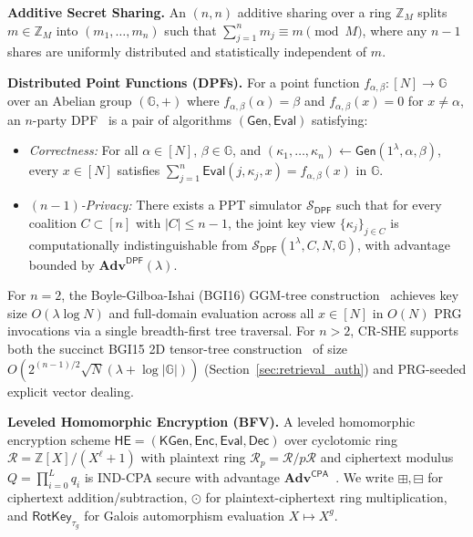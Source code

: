 \documentclass[11pt,a4paper]{article}
\begin{document}
\textbf{Additive Secret Sharing.} An $(n,n)$ additive sharing over a ring $\mathbb{Z}_M$ splits $m \in \mathbb{Z}_M$ into $(m_1, \dots, m_n)$ such that $\sum_{j=1}^n m_j \equiv m \pmod M$, where any $n-1$ shares are uniformly distributed and statistically independent of $m$.

\textbf{Distributed Point Functions (DPFs).} For a point function $f_{\alpha,\beta} : [N] \to \mathbb{G}$ over an Abelian group $(\mathbb{G}, +)$ where $f_{\alpha,\beta}(\alpha) = \beta$ and $f_{\alpha,\beta}(x) = 0$ for $x \neq \alpha$, an $n$-party DPF~\cite{gilboa2014,boyle2015,boyle2016} is a pair of algorithms $(\mathsf{Gen}, \mathsf{Eval})$ satisfying:
\begin{itemize}\setlength{\itemsep}{2pt}\setlength{\parskip}{0pt}
    \item \textit{Correctness:} For all $\alpha \in [N]$, $\beta \in \mathbb{G}$, and $(\kappa_1, \dots, \kappa_n) \leftarrow \mathsf{Gen}(1^\lambda, \alpha, \beta)$, every $x \in [N]$ satisfies $\sum_{j=1}^n \mathsf{Eval}(j, \kappa_j, x) = f_{\alpha,\beta}(x)$ in $\mathbb{G}$.
    \item \textit{$(n-1)$-Privacy:} There exists a PPT simulator $\mathcal{S}_{\mathsf{DPF}}$ such that for every coalition $C \subset [n]$ with $|C| \le n-1$, the joint key view $\{\kappa_j\}_{j \in C}$ is computationally indistinguishable from $\mathcal{S}_{\mathsf{DPF}}(1^\lambda, C, N, \mathbb{G})$, with advantage bounded by $\mathbf{Adv}^{\mathsf{DPF}}(\lambda)$.
\end{itemize}
For $n = 2$, the Boyle-Gilboa-Ishai (BGI16) GGM-tree construction~\cite{boyle2016} achieves key size $O(\lambda \log N)$ and full-domain evaluation across all $x \in [N]$ in $O(N)$ PRG invocations via a single breadth-first tree traversal. For $n > 2$, CR-SHE supports both the succinct BGI15 2D tensor-tree construction~\cite{boyle2015} of size $O(2^{(n-1)/2}\sqrt{N}(\lambda + \log|\mathbb{G}|))$ (Section~\ref{sec:retrieval_auth}) and PRG-seeded explicit vector dealing.

\textbf{Leveled Homomorphic Encryption (BFV).} A leveled homomorphic encryption scheme $\mathsf{HE} = (\mathsf{KGen}, \mathsf{Enc}, \mathsf{Eval}, \mathsf{Dec})$ over cyclotomic ring $\mathcal{R} = \mathbb{Z}[X]/(X^\ell + 1)$ with plaintext ring $\mathcal{R}_p = \mathcal{R}/p\mathcal{R}$ and ciphertext modulus $Q = \prod_{i=0}^L q_i$ is IND-CPA secure with advantage $\mathbf{Adv}^{\mathsf{CPA}}$~\cite{fan2012,halevi2014}. We write $\boxplus, \boxminus$ for ciphertext addition/subtraction, $\odot$ for plaintext-ciphertext ring multiplication, and $\mathsf{RotKey}_{\tau_g}$ for Galois automorphism evaluation $X \mapsto X^g$.
\end{document}
